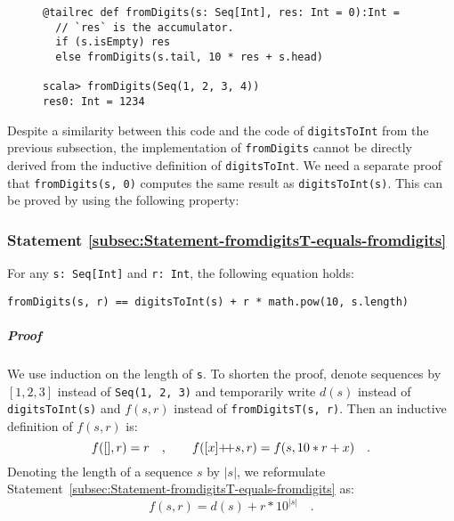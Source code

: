 \begin{wrapfigure}{l}{0.57\columnwidth}%
\vspace{-0.75\baselineskip}
\begin{lstlisting}
@tailrec def fromDigits(s: Seq[Int], res: Int = 0):Int =
  // `res` is the accumulator.
  if (s.isEmpty) res
  else fromDigits(s.tail, 10 * res + s.head)

scala> fromDigits(Seq(1, 2, 3, 4))
res0: Int = 1234
\end{lstlisting}

\vspace{-1\baselineskip}
\end{wrapfigure}%

\noindent Despite a similarity between this code and the code of \lstinline!digitsToInt!
from the previous subsection, the implementation of \lstinline!fromDigits!
cannot be directly derived from the inductive definition of \lstinline!digitsToInt!.
We need a separate proof that \lstinline!fromDigits(s, 0)! computes
the same result as \lstinline!digitsToInt(s)!. This can be proved
by using the following property:

\subsubsection{Statement \label{subsec:Statement-fromdigitsT-equals-fromdigits}\ref{subsec:Statement-fromdigitsT-equals-fromdigits}}

For any \lstinline!s: Seq[Int]! and \lstinline!r: Int!, the following
equation holds:
\begin{lstlisting}
fromDigits(s, r) == digitsToInt(s) + r * math.pow(10, s.length)
\end{lstlisting}


\subparagraph{Proof}

We use induction on the length of \lstinline!s!. To shorten the proof,
denote sequences by $\left[1,2,3\right]$ instead of \lstinline!Seq(1, 2, 3)!
and temporarily write $d(s)$ instead of \lstinline!digitsToInt(s)!
and $f(s,r)$ instead of \lstinline!fromDigitsT(s, r)!. Then an inductive
definition of $f(s,r)$ is:
\begin{equation}
f([],r)=r\quad,\quad\quad f([x]{\displaystyle }{+\negmedspace+} s,r)=f(s,10*r+x)\quad.\label{eq:stmt-fromdigitsT-expand-f}
\end{equation}
Denoting the length of a sequence $s$ by $\left|s\right|$, we reformulate
Statement~\ref{subsec:Statement-fromdigitsT-equals-fromdigits} as:
\begin{equation}
f(s,r)=d(s)+r*10^{\left|s\right|}\quad.\label{eq:stmt-fromdigitsT-reformulated}
\end{equation}

